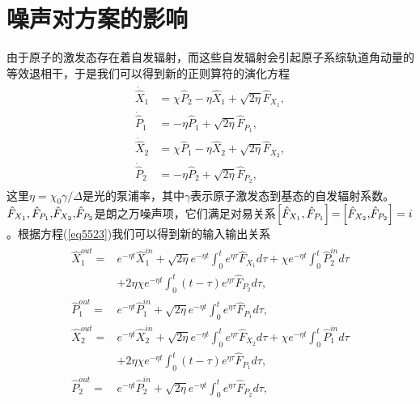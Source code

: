 \section{噪声对方案的影响}
\vbox{}
由于原子的激发态存在着自发辐射，而这些自发辐射会引起原子系综轨道角动量的等效退相干，于是我们可以得到新的正则算符的演化方程\cite{liu2018spin}
\begin{align}\label{eq5523}
	\begin{split}
		{\dot{ \hat X}_1} &= \chi {{\hat P}_2} - \eta {{\hat X}_1} + \sqrt {2\eta } {\hat F}_{{X_1}},\\
		{\dot{ \hat P}_1} &=  - \eta {{\hat P}_1} + \sqrt {2\eta } {{\hat F}_{{P_1}}},\\
		{\dot {\hat X}_2} &= \chi {{\hat P}_1} - \eta {{\hat X}_2} + \sqrt {2\eta } {\hat F}_{{X_2}},\\
		{\dot {\hat P}_2} &=  - \eta {{\hat P}_2} + \sqrt {2\eta } {{\hat F}_{{P_2}}},
	\end{split}
\end{align}
这里$\eta=\chi_0 \gamma/\Delta$是光的泵浦率，其中$\gamma$表示原子激发态到基态的自发辐射系数。${\hat F_{{X_1}}},{\hat F_{{P_1}}}{\rm{, }}{\hat F_{{X_2}}}{\rm{, }}{\hat F_{{P_2}}}$是朗之万噪声项，它们满足对易关系$\left[ {{{\hat F}_{{X_1}}},{{\hat F}_{{P_1}}}} \right]{\rm{ = }}\left[ {{{\hat F}_{{X_2}}}{\rm{, }}{{\hat F}_{{P_2}}}} \right] = i$。根据方程(\ref{eq5523})我们可以得到新的输入输出关系
\begin{align}\label{eq5524}
	\begin{split}
		\hat X_1^{out} =& {e^{ - \eta t}}\hat X_1^{in} 
		+ \sqrt {2\eta } {e^{ - \eta t}}\int_0^t {{e^{\eta \tau }}{{\hat F}_{{X_1}}}d\tau  
			+ \chi {e^{ - \eta t}}\int_0^t {\hat P_2^{in}d\tau } } \\
		&+ 2\eta \chi {e^{ - \eta t}}\int_0^t {(t - \tau ){e^{\eta \tau }}{{\hat F}_{{P_2}}}d\tau } ,\\
		\hat P_1^{out} =& {e^{ - \eta t}}\hat P_1^{in} 
		+ \sqrt {2\eta } {e^{ - \eta t}}\int_0^t {{e^{\eta \tau }}{{\hat F}_{{P_1}}}d\tau ,} \\
		\hat X_2^{out} =& {e^{ - \eta t}}\hat X_2^{in} 
		+ \sqrt {2\eta } {e^{ - \eta t}}\int_0^t {{e^{\eta \tau }}{{\hat F}_{{X_2}}}d\tau  
			+ \chi {e^{ - \eta t}}\int_0^t {\hat P_1^{in}d\tau } } \\
		&+ 2\eta \chi {e^{ - \eta t}}\int_0^t {(t - \tau ){e^{\eta \tau }}{{\hat F}_{{P_1}}}d\tau } ,\\
		\hat P_2^{out} =& {e^{ - \eta t}}\hat P_2^{in} 
		+ \sqrt {2\eta } {e^{ - \eta t}}\int_0^t {{e^{\eta \tau }}{{\hat F}_{{P_2}}}d\tau } ,
	\end{split}
\end{align}
